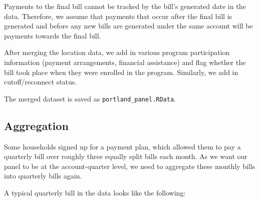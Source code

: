 \documentclass[11pt]{article}
\begin{document}
Payments to the final bill cannot be tracked by the bill's generated date in the data. Therefore, we assume that payments that occur after the final bill is generated and before any new bills are generated under the same account will be payments towards the final bill.

After merging the location data, we add in various program participation information (payment arrangements, financial assistance) and flag whether the bill took place when they were enrolled in the program. Similarly, we add in cutoff/reconnect status.

The merged dataset is saved as \texttt{portland\_panel.RData}.

\subsection*{Aggregation}

Some households signed up for a payment plan, which allowed them to pay a quarterly bill over roughly three equally split bills each month. As we want our panel to be at the account-quarter level, we need to aggregate these monthly bills into quarterly bills again.

A typical quarterly bill in the data looks like the following:
\begin{table}[H]
\centering
\caption{Typical Bill}
\end{table}
\end{document}
